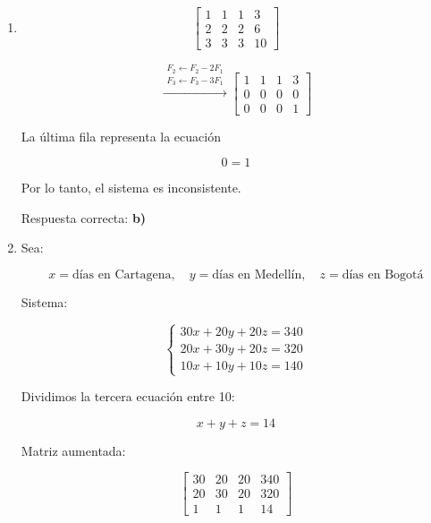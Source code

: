 \documentclass[12pt,letterpaper]{article}
\begin{document}
\begin{enumerate}
\[
\xrightarrow{F_1 \leftarrow F_1 - F_2}
\left[
\begin{array}{ccc|c}
1 & 0 & 0 & 1 \\
0 & 1 & 0 & 2 \\
0 & 0 & 1 & 3
\end{array}
\right]
\]

Solución:

\[
x = 1, \quad y = 2, \quad z = 3
\]

\item 

\[
\left[
\begin{array}{ccc|c}
1 & 1 & 1 & 3 \\
2 & 2 & 2 & 6 \\
3 & 3 & 3 & 10
\end{array}
\right]
\]

\[
\xrightarrow{\substack{F_2 \leftarrow F_2 - 2F_1\\ F_3 \leftarrow F_3 - 3F_1}}
\left[
\begin{array}{ccc|c}
1 & 1 & 1 & 3 \\
0 & 0 & 0 & 0 \\
0 & 0 & 0 & 1
\end{array}
\right]
\]

La última fila representa la ecuación

\[
0 = 1
\]

Por lo tanto, el sistema es inconsistente.

Respuesta correcta: \textbf{b)}

\newpage

\item 

Sea:

\[
x = \text{días en Cartagena}, \quad
y = \text{días en Medellín}, \quad
z = \text{días en Bogotá}
\]

Sistema:

\[
\begin{cases}
30x + 20y + 20z = 340 \\
20x + 30y + 20z = 320 \\
10x + 10y + 10z = 140
\end{cases}
\]

Dividimos la tercera ecuación entre 10:

\[
x + y + z = 14
\]

Matriz aumentada:

\[
\left[
\begin{array}{ccc|c}
30 & 20 & 20 & 340 \\
20 & 30 & 20 & 320 \\
1 & 1 & 1 & 14
\end{array}
\right]
\]


\end{enumerate}
\end{document}
